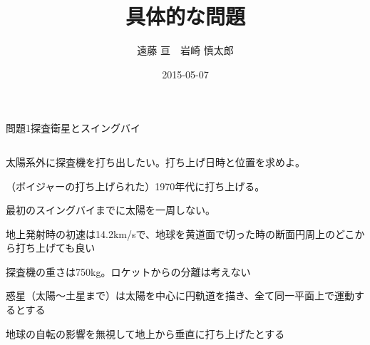 \documentclass[dvipdfmx]{beamer}
\title[2015年度初年次ゼミ問題]{具体的な問題}
\subtitle{}
\author[遠藤 亘　岩崎 慎太郎]{遠藤 亘　岩崎 慎太郎}
\institute[田浦研]{情報理工学系研究科 修士1年 田浦研究室}
\date{2015-05-07}
\newenvironment{wideitemize}{\itemize\setlength{\itemsep}{1em}}{\enditemize}
\newenvironment{wideitemize2}{\itemize\setlength{\itemsep}{0.2em}}{\enditemize}
\begin{document}
\begin{frame}
\titlepage
\end{frame}



\begin{frame}{問題1}{探査衛星とスイングバイ}
\begin{columns}[t]
\begin{column}{0.7\textwidth}
\begin{wideitemize}
	\item 太陽系外に探査機を打ち出したい。打ち上げ日時と位置を求めよ。
	\begin{wideitemize2}
		\item （ボイジャーの打ち上げられた）1970年代に打ち上げる。
		\item 最初のスイングバイまでに太陽を一周しない。
		\item 地上発射時の初速は14.2km/sで、地球を黄道面で切った時の断面円周上のどこから打ち上げても良い
		\item 探査機の重さは750kg。ロケットからの分離は考えない
		\item 惑星（太陽～土星まで）は太陽を中心に円軌道を描き、全て同一平面上で運動するとする
		\item 地球の自転の影響を無視して地上から垂直に打ち上げたとする
	\end{wideitemize2}
\end{wideitemize}


\end{column}
\end{columns}
\end{frame}
\end{document}
